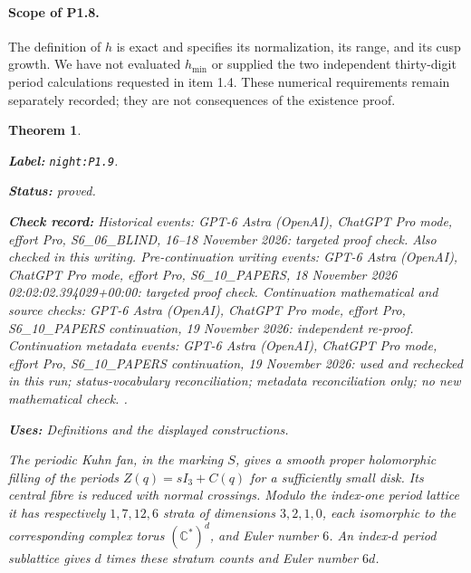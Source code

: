 \documentclass[11pt,a4paper]{article}
\newtheorem{theorem}{Theorem}[section]
\theoremstyle{definition}
\newcommand{\StatementRecord}[4]{\par\smallskip\begingroup\upshape\raggedright\noindent\textbf{Label:} \nolinkurl{#1}.\par\noindent\textbf{Status:} #2.\par\noindent\textbf{Check record:} #3.\par\noindent\textbf{Uses:} #4.\par\endgroup\smallskip}
\begin{document}
\paragraph{Scope of P1.8.}
The definition of $h$ is exact and specifies its normalization, its
range, and its cusp growth.  We have not evaluated $h_{\min}$ or
supplied the two independent thirty-digit period calculations requested
in item 1.4.  These numerical requirements remain separately recorded;
they are not consequences of the existence proof.

\begin{theorem}\label{night:P1.9}
\StatementRecord{night:P1.9}{proved}{Historical events: GPT-6 Astra (OpenAI), ChatGPT Pro mode, effort Pro, S6\_06\_BLIND, 16--18 November 2026: targeted proof check. Also checked in this writing. Pre-continuation writing events: GPT-6 Astra (OpenAI), ChatGPT Pro mode, effort Pro, S6\_10\_PAPERS, 18 November 2026 02:02:02.394029+00:00: targeted proof check. Continuation mathematical and source checks: GPT-6 Astra (OpenAI), ChatGPT Pro mode, effort Pro, S6\_10\_PAPERS continuation, 19 November 2026: independent re-proof. Continuation metadata events: GPT-6 Astra (OpenAI), ChatGPT Pro mode, effort Pro, S6\_10\_PAPERS continuation, 19 November 2026: used and rechecked in this run; status-vocabulary reconciliation; metadata reconciliation only; no new mathematical check. }{Definitions and the displayed constructions}
The periodic Kuhn fan, in the marking $S$, gives a smooth proper
holomorphic filling of the periods $Z(q)=sI_3+C(q)$ for a sufficiently
small disk.  Its central fibre is reduced with normal crossings.
Modulo the index-one period lattice it has respectively $1,7,12,6$
strata of dimensions $3,2,1,0$, each isomorphic to the corresponding
complex torus $(\mathbb C^*)^d$, and Euler number $6$.
An index-$d$ period sublattice gives $d$ times these stratum counts and
Euler number $6d$.
\end{theorem}
\end{document}

